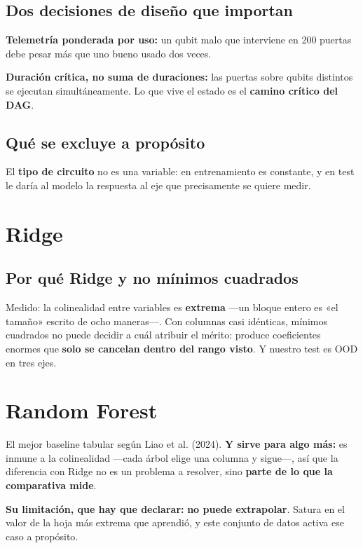\subsection{Dos decisiones de diseño que importan}
\textbf{Telemetría ponderada por uso:} un qubit malo que interviene en 200 puertas debe pesar
más que uno bueno usado dos veces.

\textbf{Duración crítica, no suma de duraciones:} las puertas sobre qubits distintos se
ejecutan simultáneamente. Lo que vive el estado es el \textbf{camino crítico del DAG}.

\subsection{Qué se excluye a propósito}
El \textbf{tipo de circuito} no es una variable: en entrenamiento es constante, y en test le
daría al modelo la respuesta al eje que precisamente se quiere medir.

\section{Ridge}
\label{sec:ridge}
\subsection{Por qué Ridge y no mínimos cuadrados}
Medido: la colinealidad entre variables es \textbf{extrema} —un bloque entero es «el tamaño»
escrito de ocho maneras—. Con columnas casi idénticas, mínimos cuadrados no puede decidir a
cuál atribuir el mérito: produce coeficientes enormes que \textbf{solo se cancelan dentro del
rango visto}. Y nuestro test es OOD en tres ejes.

\section{Random Forest}
\label{sec:rf}
El mejor baseline tabular según Liao et al. (2024). \textbf{Y sirve para algo más:} es inmune
a la colinealidad —cada árbol elige una columna y sigue—, así que la diferencia con Ridge no
es un problema a resolver, sino \textbf{parte de lo que la comparativa mide}.

\textbf{Su limitación, que hay que declarar:} \textbf{no puede extrapolar}. Satura en el valor
de la hoja más extrema que aprendió, y este conjunto de datos activa ese caso a propósito.

